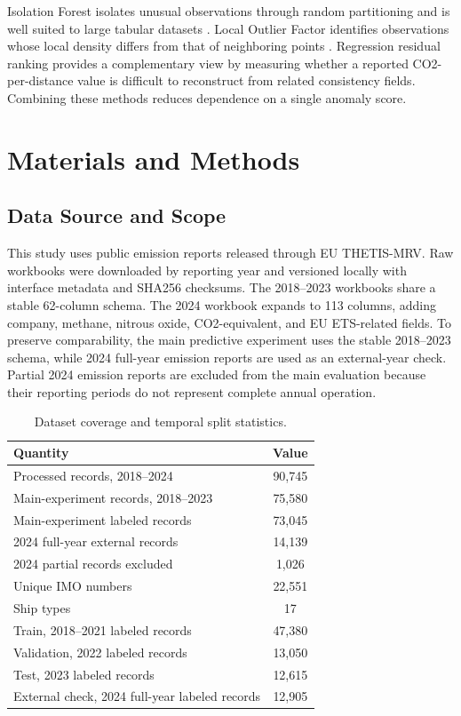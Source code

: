 \documentclass[jmse,article,submit,pdftex,oneauthor]{Definitions/mdpi}
\begin{document}
Isolation Forest isolates unusual observations through random partitioning and is well suited to large tabular datasets \cite{liu2008isolation_forest}. Local Outlier Factor identifies observations whose local density differs from that of neighboring points \cite{breunig2000lof}. Regression residual ranking provides a complementary view by measuring whether a reported CO2-per-distance value is difficult to reconstruct from related consistency fields. Combining these methods reduces dependence on a single anomaly score.

\section{Materials and Methods}

\subsection{Data Source and Scope}

This study uses public emission reports released through EU THETIS-MRV. Raw workbooks were downloaded by reporting year and versioned locally with interface metadata and SHA256 checksums. The 2018--2023 workbooks share a stable 62-column schema. The 2024 workbook expands to 113 columns, adding company, methane, nitrous oxide, CO2-equivalent, and EU ETS-related fields. To preserve comparability, the main predictive experiment uses the stable 2018--2023 schema, while 2024 full-year emission reports are used as an external-year check. Partial 2024 emission reports are excluded from the main evaluation because their reporting periods do not represent complete annual operation.

\begin{table}[H]
\caption{Dataset coverage and temporal split statistics.\label{tab:data}}
\begin{tabularx}{\textwidth}{LC}
\toprule
\textbf{Quantity} & \textbf{Value}\\
\midrule
Processed records, 2018--2024 & 90,745\\
Main-experiment records, 2018--2023 & 75,580\\
Main-experiment labeled records & 73,045\\
2024 full-year external records & 14,139\\
2024 partial records excluded & 1,026\\
Unique IMO numbers & 22,551\\
Ship types & 17\\
Train, 2018--2021 labeled records & 47,380\\
Validation, 2022 labeled records & 13,050\\
Test, 2023 labeled records & 12,615\\
External check, 2024 full-year labeled records & 12,905\\
\bottomrule
\end{tabularx}
\end{table}
\end{document}
